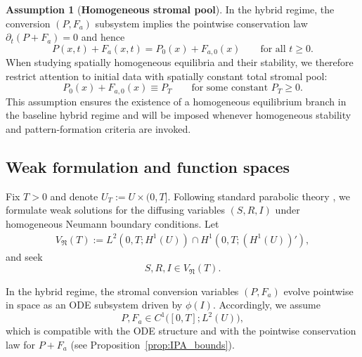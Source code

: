 \documentclass[pdflatex,sn-mathphys-ay]{sn-jnl}
\theoremstyle{thmstyleone}
\theoremstyle{definition}
\newtheorem{assumption}[theorem]{Assumption}
\theoremstyle{remark}
\begin{document}
\begin{assumption}[\textbf{Homogeneous stromal pool}]
\label{ass:homogeneous_pool}
In the hybrid regime, the conversion $(P,F_a)$ subsystem implies the pointwise conservation law $\partial_t(P+F_a)=0$ and hence
\[
P(x,t)+F_a(x,t)=P_0(x)+F_{a,0}(x)
\qquad \text{for all } t\ge 0.
\]
When studying spatially homogeneous equilibria and their stability, we therefore restrict attention to initial data with spatially constant total stromal pool:
\begin{equation}
\label{eq:pool_constant}
P_0(x)+F_{a,0}(x)\equiv P_T\qquad \text{for some constant }P_T\ge 0.
\end{equation}
This assumption ensures the existence of a homogeneous equilibrium branch in the baseline hybrid regime and will be imposed whenever homogeneous stability and pattern-formation criteria are invoked.
\end{assumption}


\subsection{Weak formulation and function spaces}
\label{subsec:weak_formulation}

Fix $T>0$ and denote $U_T:=U\times(0,T]$. 
Following standard parabolic theory \citep{evans2022partial,amann1995linear}, we formulate weak solutions for the diffusing variables $(S,R,I)$ under homogeneous Neumann boundary conditions. 
Let
\begin{align*}
  V_{\mathfrak N}(T)
  := L^2(0,T;H^1(U))\cap H^1\!\left(0,T;(H^1(U))'\right),
\end{align*}
and seek
\[
S,R,I\in V_{\mathfrak N}(T).
\]

In the hybrid regime, the stromal conversion variables $(P,F_a)$ evolve pointwise in space as an ODE subsystem driven by $\phi(I)$. 
Accordingly, we assume
\[
P,F_a\in C^1\bigl([0,T];L^2(U)\bigr),
\]
which is compatible with the ODE structure and with the pointwise conservation law for $P+F_a$ (see Proposition~\ref{prop:IPA_bounds}).
\end{document}

